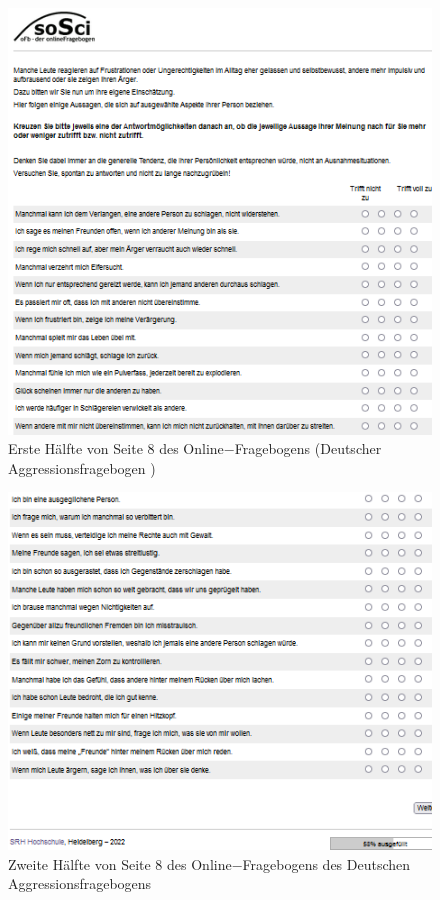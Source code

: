 \begin{appendices}
    \newpage
    \begin{figure}[htb!]
        \centering
            \includegraphics[width=\textwidth, frame]{Seite 8_1.png}
            \caption[]{Erste Hälfte von Seite 8 des Online$-$Fragebogens (Deutscher Aggressionsfragebogen \parencite{Aggressionsfragebogen})}
    \end{figure}
    
    \newpage
    \begin{figure}[htb!]
        \centering
            \includegraphics[width=\textwidth, frame]{Seite 8_2.png}
            \caption[]{Zweite Hälfte von Seite 8 des Online$-$Fragebogens des Deutschen Aggressionsfragebogens \parencite{Aggressionsfragebogen}}
    \end{figure}
    

\end{appendices}
